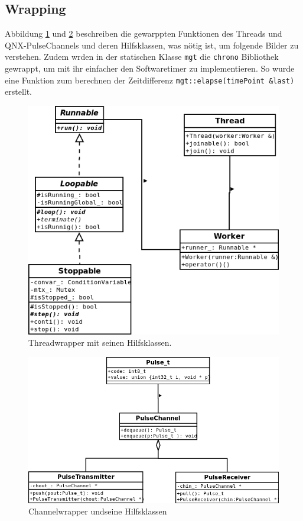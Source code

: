 \documentclass[
   draft=false
  ,paper=a4
  ,twoside=true
  ,fontsize=11pt
  ,headsepline
  ,DIV11
  ,parskip=full+
]{scrartcl} %
\begin{document}
\subsection{Wrapping}
Abbildung \ref{fig:thread} und \ref{fig:channel} beschreiben die gewarppten
Funktionen des Threads und QNX-PulseChannels und deren Hilfsklassen, was nötig ist, um folgende Bilder zu verstehen.
Zudem wrden in der statischen Klasse \texttt{mgt} die \texttt{chrono} Bibliothek gewrappt, um mit ihr einfacher den Softwaretimer zu implementieren.
So wurde eine Funktion zum berechnen der Zeitdifferenz \texttt{mgt::elapse(timePoint \&last)} erstellt.   
\begin{figure}[htp]
  	\centering
    \includegraphics[width=\textwidth]{./IMG/thread.png}
    \caption[thread-uml]{Threadwrapper mit seinen Hilfsklassen.}
     \label{fig:thread}
\end{figure}

\begin{figure}[htp]
  	\centering
    \includegraphics[width=\textwidth]{./IMG/channel.png}
    \caption[channel-uml]{Channelwrapper undseine Hilfsklassen}
     \label{fig:channel}
\end{figure}
\end{document}
